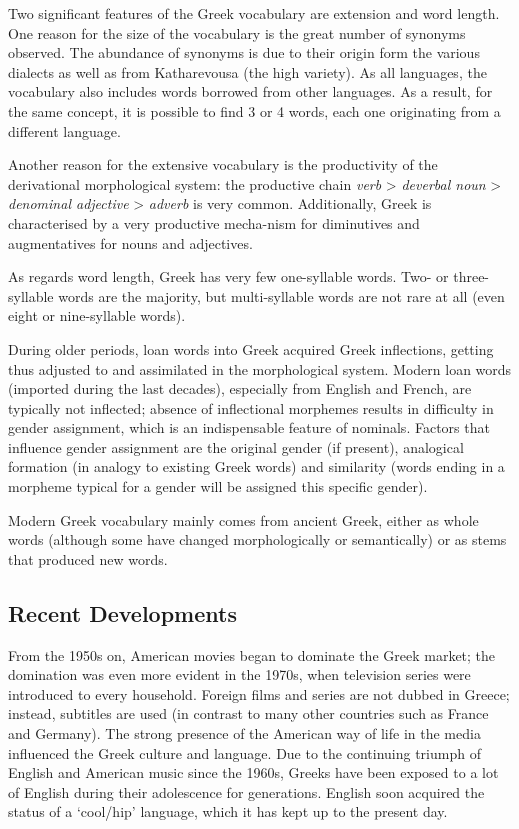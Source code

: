 \begin{multicols}{2}
Two significant features of the Greek vocabulary are extension and word length. One reason for the size of the vocabulary is the great number of synonyms observed. The abundance of synonyms is due to their origin form the various dialects as well as from Katharevousa (the high variety). As all languages, the vocabulary also includes words borrowed from other languages. As a result, for the same concept, it is possible to find 3 or 4 words, each one originating from a different language.


Another reason for the extensive vocabulary is the productivity of the derivational morphological system: the productive chain \textit{verb} >  \textit{deverbal noun} >  \textit{denominal adjective} > \textit{adverb} is very common. Additionally, Greek is characterised by a very productive mecha-nism for diminutives and augmentatives for nouns and adjectives.

As regards word length, Greek has very few one-syllable words. Two- or three-syllable words are the majority, but multi-syllable words are not rare at all (even eight or nine-syllable words).

During older periods, loan words into Greek acquired Greek inflections, getting thus adjusted to and assimilated in the morphological system. Modern loan words (imported during the last decades), especially from English and French, are typically not inflected; absence of inflectional morphemes results in difficulty in gender assignment, which is an indispensable feature of nominals. Factors that influence gender assignment are the original gender (if present), analogical formation (in analogy to existing Greek words) and similarity (words ending in a morpheme typical for a gender will be assigned this specific gender).

Modern Greek vocabulary mainly comes from ancient Greek, either as whole words (although some have changed morphologically or semantically) or as stems that produced new words.

\subsection{Recent Developments}

From the 1950s on, American movies began to dominate the Greek market; the domination was even more evident in the 1970s, when television series were introduced to every household. Foreign films and series are not dubbed in Greece; instead, subtitles are used (in contrast to many other countries such as France and Germany). The strong presence of the American way of life in the media influenced the Greek culture and language. Due to the continuing triumph of English and American music since the 1960s, Greeks have been exposed to a lot of English during their adolescence for generations. English soon acquired the status of a ‘cool/hip’ language, which it has kept up to the present day.


\end{multicols}
